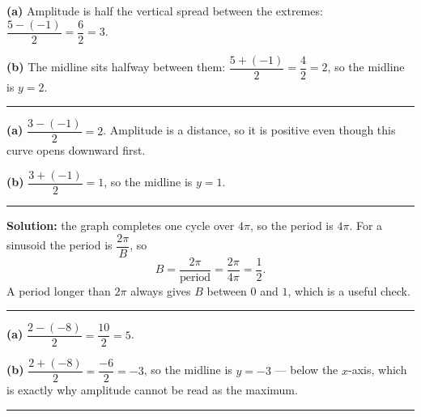 \documentclass[12pt]{article}
\begin{document}



\textbf{(a)} Amplitude is half the vertical spread between the extremes:
$\dfrac{5 - (-1)}{2} = \dfrac{6}{2} = 3$. 

\textbf{(b)} The midline sits halfway between them: $\dfrac{5 + (-1)}{2} = \dfrac{4}{2} = 2$, so the midline is $y = 2$. 

\vspace{0.1cm}\noindent\rule{\linewidth}{0.2pt}\vspace{0.1cm}


\textbf{(a)} $\dfrac{3 - (-1)}{2} = 2$. Amplitude is a distance, so it is positive even though this curve opens downward first. 

\textbf{(b)} $\dfrac{3 + (-1)}{2} = 1$, so the midline is $y = 1$. 

\vspace{0.1cm}\noindent\rule{\linewidth}{0.2pt}\vspace{0.1cm}


\textbf{Solution:} the graph completes one cycle over $4\pi$, so the period is $4\pi$. For a sinusoid the period is $\dfrac{2\pi}{B}$, so
\[ B = \frac{2\pi}{\text{period}} = \frac{2\pi}{4\pi} = \frac{1}{2}. \]
A period longer than $2\pi$ always gives $B$ between $0$ and $1$, which is a useful check. 

\vspace{0.1cm}\noindent\rule{\linewidth}{0.2pt}\vspace{0.1cm}


\textbf{(a)} $\dfrac{2 - (-8)}{2} = \dfrac{10}{2} = 5$. 

\textbf{(b)} $\dfrac{2 + (-8)}{2} = \dfrac{-6}{2} = -3$, so the midline is $y = -3$ --- below the $x$-axis, which is exactly why amplitude cannot be read as the maximum. 

\vspace{0.1cm}\noindent\rule{\linewidth}{0.2pt}\vspace{0.1cm}
\end{document}
